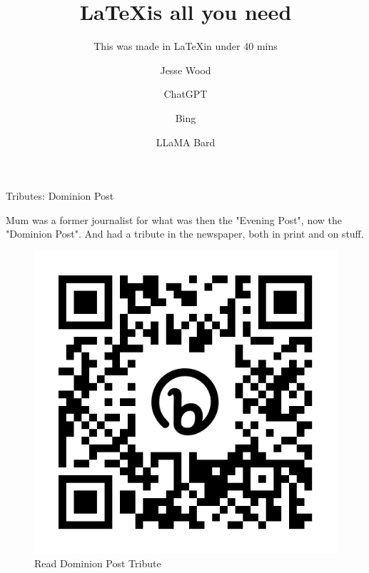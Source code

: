 \documentclass{beamer}
\title[\LaTeX] %
{\LaTeX is all you need}
\subtitle{This was made in \LaTeX in under 40 mins}
\author[jesse.wood@ecs.vuw.ac.nz] %
{Jesse Wood\inst{1}\orcidlink{0000-0003-3756-2122} \and
    ChatGPT \inst{1}\orcidlink{0000-0002-6930-6863} \and
    Bing \inst{1}\orcidlink{0000-0003-4463-9538} \and
    LLaMA \inst{3}\orcidlink{0000-0002-4898-6724}
    Bard\inst{4}\orcidlink{0000-0002-4865-8026} \and
}
\institute[] %
{
    \inst{1}%
    School of Engineering and Computer Science | Te Kura Mātai Pūkaha, Pūrorohiko
    Victoria University of Wellington | Te Herenga Waka
  
    \inst{2}%
    Open AI | United States: San Francisco: Poineer building, 3180 18th St, San Francisco

    \inst{3}%
    Meta AI | Menlo Park, California, headquarters, London, United Kingdom, 

    \inst{4}%
    Google AI | 340 Main Street, Los Angeles, CA 90291, United States
}
\date[AJCAI December 2022] %
{
    \snapper \bluecod \gurnard \tarakihi 
}
\begin{document}

\frame{\titlepage}

\begin{frame}{Tributes: Dominion Post}
\vspace{0.2cm}

Mum was a former journalist for what was then the "Evening Post", now the "Dominion Post". And had a tribute in the newspaper, both in print and on stuff.

\vspace{1cm}

\begin{figure}
    \centering
    \includegraphics[height=0.3\textheight]{assets/qr/dominion_post_qr.png}
    \caption{Read Dominion Post Tribute}
    \label{fig:qr-code}
\end{figure}
\end{frame}
\end{document}
